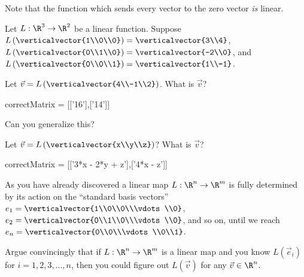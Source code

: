 \documentclass{ximera}
\begin{document}
\begin{question}
  \begin{warning}
    Note that the function which sends every vector to the zero vector
    \textit{is} linear.
  \end{warning}
\end{question}
	
\begin{question}
  Let $L:\R^3 \to \R^2$ be a linear function.  Suppose
  $L\left(\verticalvector{1\\0\\0}\right) = \verticalvector{3\\4}$,
  $L\left(\verticalvector{0\\1\\0}\right) = \verticalvector{-2\\0}$,
  and $L\left(\verticalvector{0\\0\\1}\right) =
  \verticalvector{1\\-1}$.
  
  \begin{solution}
    Let $\vec{v} = L \left(\verticalvector{4\\-1\\2}\right)$.  What is $\vec{v}$?

    \begin{matrix-answer}[name=v]
      correctMatrix = [['16'],['14']]
    \end{matrix-answer}
    
  \end{solution}

  Can you generalize this?

  \begin{solution}
    Let $\vec{v} = L\left(\verticalvector{x\\y\\z}\right)$?  What is $\vec{v}$?

    \begin{matrix-answer}[name=v]
      correctMatrix = [['3*x - 2*y + z'],['4*x - z']]
    \end{matrix-answer}
    
  \end{solution}

  As you have already discovered a linear map $L: \R^n \to \R^m$ is
  fully determined by its action on the ``standard basis vectors''
  $e_1 = \verticalvector{1\\0\\0\\\vdots\\0}$, $e_2 =
  \verticalvector{0\\1\\0\\\vdots\\0}$, and so on, until we reach $e_n
  = \verticalvector{0\\0\\\vdots\\0\\1}$.

  Argue convincingly that if $L:\R^n \to\R^m$ is a linear map and you know $L(\vec{e}_i)$ for $i=1,2,3,...,n$, then you could figure out $L(\vec{v})$ for
  any $\vec{v} \in \R^n$.
  \begin{free-response}
  \end{free-response}
\end{question}
\end{document}
